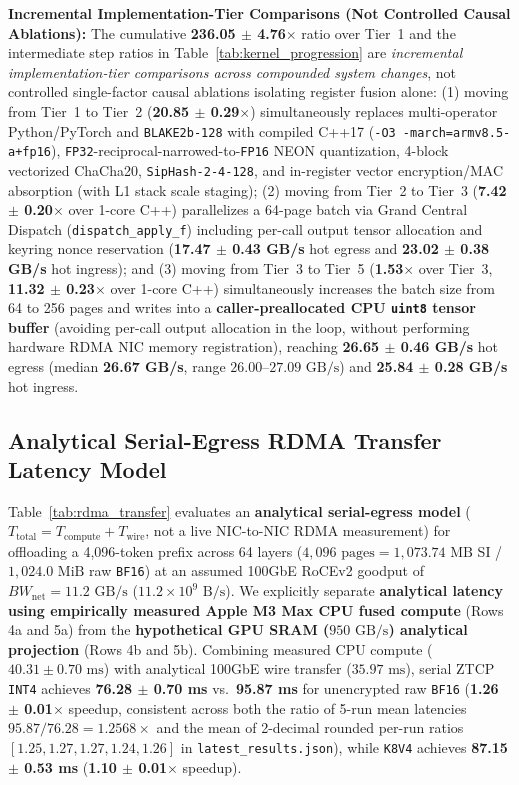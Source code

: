 \documentclass[10pt,twocolumn]{article}
\begin{document}
\textbf{Incremental Implementation-Tier Comparisons (Not Controlled Causal Ablations):} The cumulative \textbf{236.05 $\pm$ 4.76$\times$} ratio over Tier~1 and the intermediate step ratios in Table~\ref{tab:kernel_progression} are \textit{incremental implementation-tier comparisons across compounded system changes}, not controlled single-factor causal ablations isolating register fusion alone: (1) moving from Tier~1 to Tier~2 (\textbf{20.85 $\pm$ 0.29$\times$}) simultaneously replaces multi-operator Python/PyTorch and \texttt{BLAKE2b-128} with compiled C++17 (\texttt{-O3 -march=armv8.5-a+fp16}), \texttt{FP32}-reciprocal-narrowed-to-\texttt{FP16} NEON quantization, 4-block vectorized ChaCha20, \texttt{SipHash-2-4-128}, and in-register vector encryption/MAC absorption (with L1 stack scale staging); (2) moving from Tier~2 to Tier~3 (\textbf{7.42 $\pm$ 0.20$\times$} over 1-core C++) parallelizes a 64-page batch via Grand Central Dispatch (\texttt{dispatch\_apply\_f}) including per-call output tensor allocation and keyring nonce reservation (\textbf{17.47 $\pm$ 0.43 GB/s} hot egress and \textbf{23.02 $\pm$ 0.38 GB/s} hot ingress); and (3) moving from Tier~3 to Tier~5 (\textbf{1.53$\times$} over Tier~3, \textbf{11.32 $\pm$ 0.23$\times$} over 1-core C++) simultaneously increases the batch size from 64 to 256 pages and writes into a \textbf{caller-preallocated CPU \texttt{uint8} tensor buffer} (avoiding per-call output allocation in the loop, without performing hardware RDMA NIC memory registration), reaching \textbf{26.65 $\pm$ 0.46 GB/s} hot egress (median \textbf{26.67 GB/s}, range $26.00$--$27.09\text{ GB/s}$) and \textbf{25.84 $\pm$ 0.28 GB/s} hot ingress.

\subsection{Analytical Serial-Egress RDMA Transfer Latency Model}
Table~\ref{tab:rdma_transfer} evaluates an \textbf{analytical serial-egress model} ($T_{\text{total}} = T_{\text{compute}} + T_{\text{wire}}$, not a live NIC-to-NIC RDMA measurement) for offloading a 4,096-token prefix across 64 layers ($4,096\text{ pages} = 1,073.74\text{ MB}$ SI / $1,024.0\text{ MiB}$ raw \texttt{BF16}) at an assumed 100GbE RoCEv2 goodput of $BW_{\text{net}} = 11.2\text{ GB/s}$ ($11.2 \times 10^9\text{ B/s}$). We explicitly separate \textbf{analytical latency using empirically measured Apple M3 Max CPU fused compute} (Rows 4a and 5a) from the \textbf{hypothetical GPU SRAM ($950\text{ GB/s}$) analytical projection} (Rows 4b and 5b). Combining measured CPU compute ($40.31 \pm 0.70\text{ ms}$) with analytical 100GbE wire transfer ($35.97\text{ ms}$), serial ZTCP \texttt{INT4} achieves \textbf{76.28 $\pm$ 0.70 ms} vs.\ \textbf{95.87 ms} for unencrypted raw \texttt{BF16} (\textbf{1.26 $\pm$ 0.01$\times$} speedup, consistent across both the ratio of 5-run mean latencies $95.87 / 76.28 = 1.2568\times$ and the mean of 2-decimal rounded per-run ratios $[1.25, 1.27, 1.27, 1.24, 1.26]$ in \texttt{latest\_results.json}), while \texttt{K8V4} achieves \textbf{87.15 $\pm$ 0.53 ms} (\textbf{1.10 $\pm$ 0.01$\times$} speedup).
\end{document}
